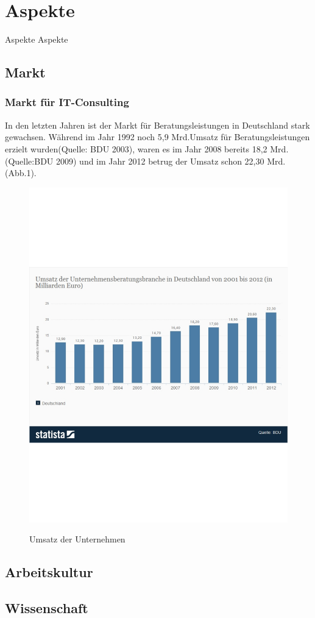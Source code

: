 \chapter{Aspekte}
Aspekte Aspekte
\section{Markt}
	\subsection{Markt für IT-Consulting}
	In den letzten Jahren ist der Markt für Beratungsleistungen in Deutschland stark gewachsen. Während im Jahr 1992 noch 5,9 Mrd.\texteuro Umsatz für Beratungsleistungen erzielt wurden(Quelle: BDU 2003), waren es im Jahr 2008 bereits 18,2 Mrd. \texteuro (Quelle:BDU 2009) und im Jahr 2012 betrug der Umsatz schon 22,30 Mrd. \texteuro (Abb.1).
	\begin{figure}[htp]
	\centering
	\includegraphics[width=0.5\linewidth]{./UmsatzUBeratungsbrancheDeutschland}
	\label{fig:UmsatzUBeratungsbrancheDeutschland}
	\caption{Umsatz der Unternehmen}
	\end{figure}
\section{Arbeitskultur}
\section{Wissenschaft}